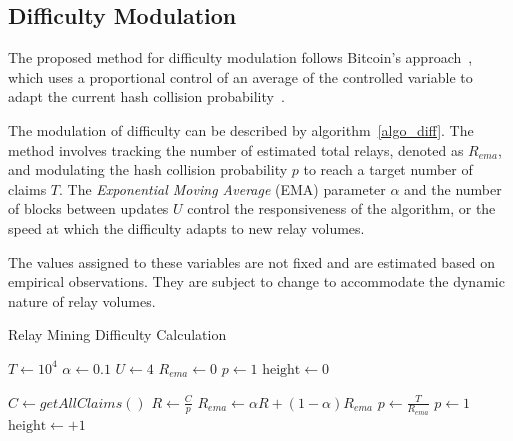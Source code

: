 \documentclass[runningheads]{llncs}
\begin{document}
\subsection{Difficulty Modulation}\label{difficulty-modulation}

The proposed method for difficulty modulation follows Bitcoin's approach~\cite{nakamoto2008bitcoin}, which uses a proportional control of an average of the controlled variable to adapt the current hash collision probability~\cite{laanwj2023bitcoin}. %

The modulation of difficulty can be described by algorithm~\ref{algo_diff}. The method involves tracking the number of estimated total relays, denoted as $R_{ema}$, and modulating the hash collision probability $p$ to reach a target number of claims $T$. The \emph{Exponential Moving Average} (EMA) parameter $\alpha$ and the number of blocks between updates $U$ control the responsiveness of the algorithm, or the speed at which the difficulty adapts to new relay volumes.

The values assigned to these variables are not fixed and are estimated based on empirical observations. They are subject to change to accommodate the dynamic nature of relay volumes.

\begin{algorithm}[h]
    \caption{Relay Mining Difficulty Calculation}\label{algo_diff}
    \begin{algorithmic}[1]
        \State $T \gets 10^4$
        \State $\alpha \gets 0.1$
        \State $U \gets 4$
        \State $R_{ema} \gets 0$ 
        \State $p \gets 1$ 
        \State $\mbox{height} \gets 0$
    
            \State $C \gets getAllClaims()$ 
            \State $R \gets \frac{C}{p}$
            \State $R_{ema} \gets \alpha R + (1-\alpha) R_{ema}$
                \State $p \gets \frac{T}{R_{ema}}$ 
                    \State $p \gets 1$ 
                \EndIf
            \EndIf
            \State $\mbox{height} \gets +1$
        \EndWhile
    \end{algorithmic}
\end{algorithm}
\end{document}
